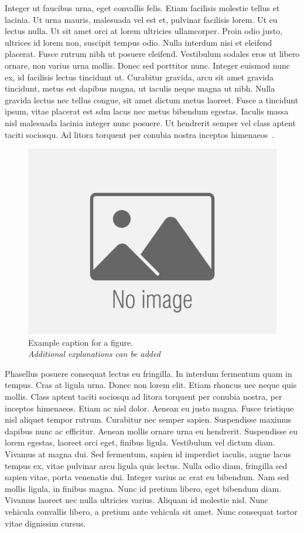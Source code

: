 Integer ut faucibus urna, eget convallis felis. Etiam facilisis molestie tellus et lacinia. Ut urna mauris, malesuada vel est et, pulvinar facilisis lorem. Ut eu lectus nulla. Ut sit amet orci at lorem ultricies ullamcorper. Proin odio justo, ultrices id lorem non, suscipit tempus odio. Nulla interdum nisi et eleifend placerat. Fusce rutrum nibh ut posuere eleifend. Vestibulum sodales eros ut libero ornare, non varius urna mollis. Donec sed porttitor nunc. Integer euismod nunc ex, id facilisis lectus tincidunt ut. Curabitur gravida, arcu sit amet gravida tincidunt, metus est dapibus magna, ut iaculis neque magna ut nibh. Nulla gravida lectus nec tellus congue, sit amet dictum metus laoreet. Fusce a tincidunt ipsum, vitae placerat est \gls{sdm} lacus nec metus bibendum egestas. Iaculis massa nisl malesuada lacinia integer nunc posuere. Ut hendrerit semper vel class aptent taciti sociosqu. Ad litora torquent per conubia nostra inceptos himenaeos~.

    \begin{figure}[hbtp!]
        \centering
        \includegraphics[width=0.5\linewidth]{Figures/image.png}
        \caption{Example caption for a figure.\\ \textit{Additional explanations can be added}}
        \label{fig:placeholder_example}
    \end{figure}

Phasellus posuere consequat lectus eu fringilla. In interdum fermentum quam in tempus. Cras at ligula urna. Donec non lorem elit. Etiam rhoncus nec neque quis mollis. Class aptent taciti sociosqu ad litora torquent per conubia nostra, per inceptos himenaeos. Etiam ac nisl dolor. Aenean eu justo magna. Fusce tristique nisl aliquet tempor rutrum. Curabitur nec semper sapien. Suspendisse maximus dapibus nunc ac efficitur. Aenean mollis ornare urna eu hendrerit. Suspendisse eu lorem egestas, laoreet orci eget, finibus ligula. Vestibulum vel dictum diam. Vivamus at magna dui. Sed fermentum, sapien id imperdiet iaculis, augue lacus tempus ex, vitae pulvinar arcu ligula quis lectus. Nulla odio diam, fringilla sed sapien vitae, porta venenatis dui. Integer varius ac erat eu bibendum. Nam sed mollis ligula, in finibus magna. Nunc id pretium libero, eget bibendum diam. Vivamus laoreet nec nulla ultricies varius. Aliquam id molestie nisl. Nunc vehicula convallis libero, a pretium ante vehicula sit amet. Nunc consequat tortor vitae dignissim cursus.


